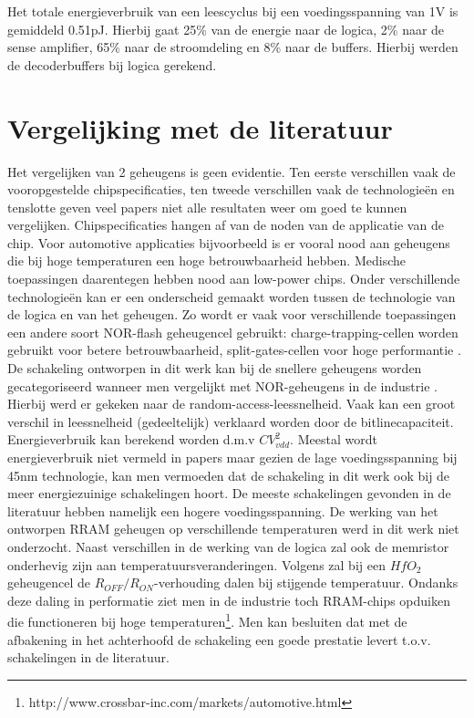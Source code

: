 Het totale energieverbruik van een leescyclus bij een voedingsspanning van 1V is gemiddeld 0.51pJ. Hierbij gaat 25\% van de energie naar de logica, 2\% naar de sense amplifier, 65\% naar de stroomdeling en 8\% naar de buffers. Hierbij werden de decoderbuffers bij logica gerekend.

\section{Vergelijking met de literatuur}
Het vergelijken van 2 geheugens is geen evidentie. Ten eerste verschillen vaak de vooropgestelde chipspecificaties, ten tweede verschillen vaak de technologieën en tenslotte geven veel papers niet alle resultaten weer om goed te kunnen vergelijken. Chipspecificaties hangen af van de noden van de applicatie van de chip. Voor automotive applicaties bijvoorbeeld is er vooral nood aan geheugens die bij hoge temperaturen een hoge betrouwbaarheid hebben. Medische toepassingen daarentegen hebben  nood aan low-power chips. Onder verschillende technologieën kan er een onderscheid gemaakt worden tussen de technologie van de logica en van het geheugen. Zo wordt er vaak voor verschillende toepassingen een andere soort NOR-flash geheugencel gebruikt: charge-trapping-cellen worden gebruikt voor betere betrouwbaarheid, split-gates-cellen voor hoge performantie \cite{5783209}. De schakeling ontworpen in dit werk kan bij de snellere geheugens worden gecategoriseerd wanneer men vergelijkt met NOR-geheugens in de industrie \cite{6649105}\cite{4433985}\cite{4027813}. Hierbij werd er gekeken naar de random-access-leessnelheid. Vaak kan een groot verschil in leessnelheid (gedeeltelijk) verklaard worden door de bitlinecapaciteit. \\ 
Energieverbruik kan berekend worden d.m.v $CV_{vdd}^{2}$. Meestal wordt energieverbruik niet vermeld in papers maar gezien de lage voedingsspanning bij 45nm technologie, kan men vermoeden dat de schakeling in dit werk ook bij de meer energiezuinige schakelingen hoort. De meeste schakelingen gevonden in de literatuur hebben namelijk een hogere voedingsspanning. De werking van het ontworpen RRAM geheugen op verschillende temperaturen werd in dit werk niet onderzocht. Naast verschillen in de werking van de logica zal ook de memristor onderhevig zijn aan temperatuursveranderingen. Volgens \cite{5948374} zal bij een $HfO_{2}$ geheugencel de $R_{OFF}/R_{ON}$-verhouding dalen bij stijgende temperatuur. Ondanks deze daling in performatie ziet men in de industrie toch RRAM-chips opduiken die functioneren bij hoge temperaturen\footnote{http://www.crossbar-inc.com/markets/automotive.html}. Men kan besluiten dat met de afbakening in het achterhoofd de schakeling een goede prestatie levert t.o.v. schakelingen in de literatuur.

